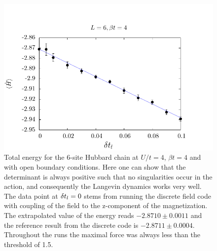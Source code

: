 \begin{figure}[H]
        \begin{center}
                \includegraphics[scale=0.9,clip]{Figures/Langevin.pdf}
            \end{center}
        \caption{Total energy for the 6-site Hubbard chain at $U/t=4$, $\beta t = 4$ and with open boundary conditions.   Here one can show that the determinant is always positive such that  no   singularities occur in the action, and consequently the Langevin dynamics works very well.  The data point at $\delta t_{l} =0$ stems from running the  discrete  field code with coupling  of the field to the z-component of the magnetization.  The extrapolated value of the energy reads
        $-2.8710   \pm 0.0011$
        and the reference result from the discrete code is
        $-2.8711   \pm  0.0004 $.
        Throughout the runs the maximal force was always less than the threshold of 1.5.   }\label{Langevin.fig}
\end{figure}

